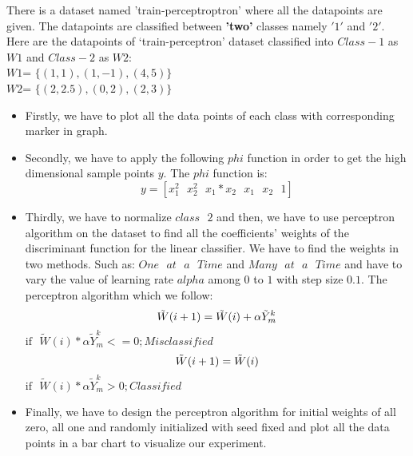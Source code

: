 \documentclass[conference]{IEEEtran}
\begin{document}
There is a dataset named 'train-perceptroptron' where all the datapoints are given. The datapoints are classified between \textbf{'two'} classes namely $'1'$ and $'2'$. Here are the datapoints of ‘train-perceptron’ dataset classified into $Class-1$ as $W1$ and $Class-2$ as $W2$:\\
	$W1$= $\{(1,1), (1, -1), (4, 5)\}$\\
	$W2$= $\{(2, 2.5), (0, 2), (2, 3)\}$\\
\begin{itemize}  
\item Firstly, we have to plot all the data points of each class with corresponding marker in graph.\\
\item Secondly, we have to apply the following $phi$ function in order to get the high dimensional sample points $y$. The $phi$ function is:\\
\begin{equation}
y= [x_1^2\textrm{   }   x_2^2\textrm{   }   x_1*x_2 \textrm{   }   x_1\textrm{   }    x_2\textrm{   }    1]
\end{equation}
\item Thirdly, we have to normalize $class\textrm{   } 2$ and then, we have to use perceptron algorithm on the dataset to find all the coefficients' weights of the discriminant function for the linear classifier. We have to find the weights in two methods. Such as: $One\textrm{   } at\textrm{   } a \textrm{   }Time$ and $Many \textrm{   }at \textrm{   }a\textrm{   } Time$ and have to vary the value of learning rate $alpha$ among $0$ to $1$ with step size $0.1$. The perceptron algorithm which we follow:\\

\begin{equation}
\tilde{W}(i+1)= \tilde{W}(i)+\alpha\tilde{Y}_m^k\\
\end{equation}
$\textrm{if}\textrm{   }\tilde{W}(i)*\alpha\tilde{Y}_m^k<=0; Misclassified$
\begin{equation}
\tilde{W}(i+1)= \tilde{W}(i)\\
\end{equation}
$\textrm{if}\textrm{   }\tilde{W}(i)*\alpha\tilde{Y}_m^k>0; Classified$

\item Finally, we have to design the perceptron algorithm for initial weights of all zero, all one and randomly initialized with seed fixed and plot all the data points in a bar chart to visualize our experiment.
\end{itemize}
\end{document}
